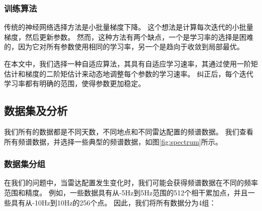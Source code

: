 \subsubsection{训练算法}

传统的神经网络选择方法是小批量梯度下降。 这个想法是计算每次迭代的小批量梯度，然后更新参数。 然而，这种方法有两个缺点，一个是学习率的选择是困难的，因为它对所有参数使用相同的学习率，另一个是趋向于收敛到局部最优。

在本文中，我们选择一种自适应算法，其具有自适应学习速率，其通过使用一阶矩估计和梯度的二阶矩估计来动态地调整每个参数的学习速率。 纠正后，每个迭代学习率都有明确的范围，使得参数更加稳定。
\subsection{数据集及分析}
我们所有的数据都是不同天数，不同地点和不同雷达配置的频谱数据。 我们查看所有频谱数据，并选择一些典型的频谱数据，如图\ref{fig:spectrum}所示。

\subsubsection{数据集分组}
在我们的问题中，当雷达配置发生变化时，我们可能会获得频谱数据在不同的频率范围和精度。 例如，一些数据具有从-5Hz到5Hz范围的512个相干累加点，并且一些具有从-10Hz到10Hz的256个点。 因此，我们将所有数据分为4组：

